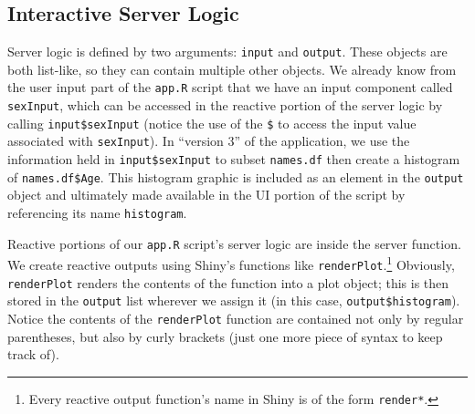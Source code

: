 \documentclass[]{krantz}
\begin{document}
\subsection{Interactive Server Logic}\label{interactive-server-logic}

Server logic is defined by two arguments: \texttt{input} and
\texttt{output}. These objects are both list-like, so they can contain
multiple other objects. We already know from the user input part of the
\texttt{app.R} script that we have an input component called
\texttt{sexInput}, which can be accessed in the reactive portion of the
server logic by calling \texttt{input\$sexInput} (notice the use of the
\texttt{\$} to access the input value associated with
\texttt{sexInput}). In ``version 3'' of the application, we use the
information held in \texttt{input\$sexInput} to subset \texttt{names.df}
then create a histogram of \texttt{names.df\$Age}. This histogram
graphic is included as an element in the \texttt{output} object and
ultimately made available in the UI portion of the script by referencing
its name \texttt{histogram}.

Reactive portions of our \texttt{app.R} script's server logic are inside
the server function. We create reactive outputs using Shiny's functions
like \texttt{renderPlot}.\footnote{Every reactive output function's name
  in Shiny is of the form \texttt{render*}.} Obviously,
\texttt{renderPlot} renders the contents of the function into a plot
object; this is then stored in the \texttt{output} list wherever we
assign it (in this case, \texttt{output\$histogram}). Notice the
contents of the \texttt{renderPlot} function are contained not only by
regular parentheses, but also by curly brackets (just one more piece of
syntax to keep track of).
\end{document}
